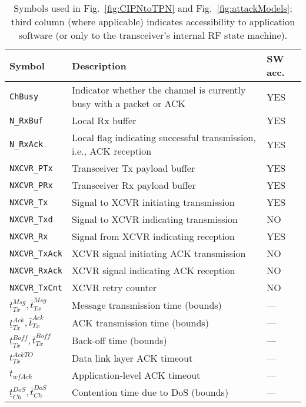 \begin{table}[t]
  \centering
    \begin{tabular}{p{1.6cm}|p{5.4cm}|p{0.4cm}}
      Symbol & Description & SW acc.\\ \hline\hline
      \verb!ChBusy! & Indicator whether the channel is currently busy with a packet or ACK & YES \\ \hline
      \verb!N_RxBuf! & Local Rx buffer & YES \\ \hline
      \verb!N_RxAck! & Local flag indicating successful transmission, i.e., ACK reception & YES \\ \hline
      \verb!NXCVR_PTx! & Transceiver Tx payload buffer & YES \\ \hline
      \verb!NXCVR_PRx! & Transceiver Rx payload buffer & YES \\ \hline
      \verb!NXCVR_Tx! & Signal to XCVR initiating transmission & YES \\ \hline
      \verb!NXCVR_Txd! & Signal to XCVR indicating transmission & NO \\ \hline
      \verb!NXCVR_Rx! & Signal from XCVR indicating reception & YES \\ \hline
      \verb!NXCVR_TxAck! & XCVR signal initiating ACK transmission & NO \\ \hline
      \verb!NXCVR_RxAck! & XCVR signal indicating ACK reception & NO \\ \hline
      \verb!NXCVR_TxCnt! & XCVR retry counter & NO \\ \hline
      $\underline{t}_{Tx}^{Msg},\overline{t}_{Tx}^{Msg}$ & Message transmission time (bounds) & --- \\ \hline
      $\underline{t}_{Tx}^{Ack},\overline{t}_{Tx}^{Ack}$ & ACK transmission time (bounds) & --- \\ \hline
      $\underline{t}_{Tx}^{Boff},\overline{t}_{Tx}^{Boff}$ & Back-off time (bounds) & --- \\ \hline
      $t_{Tx}^{AckTO}$ & Data link layer ACK timeout & --- \\ \hline
      $t_{wfAck}$ & Application-level ACK timeout & --- \\ \hline
      $\underline{t}_{Ch}^{DoS},\overline{t}_{Ch}^{DoS}$ & Contention time due to DoS (bounds) & --- \\ \hline\hline
    \end{tabular}
  \caption{Symbols used in Fig.~\ref{fig:CIPNtoTPN} and Fig.~\ref{fig:attackModels}; third column (where applicable) indicates accessibility to application software (or only to the transceiver's internal RF state machine).}\label{tab:CIPNtoTPNsymbols}
\end{table}
%

